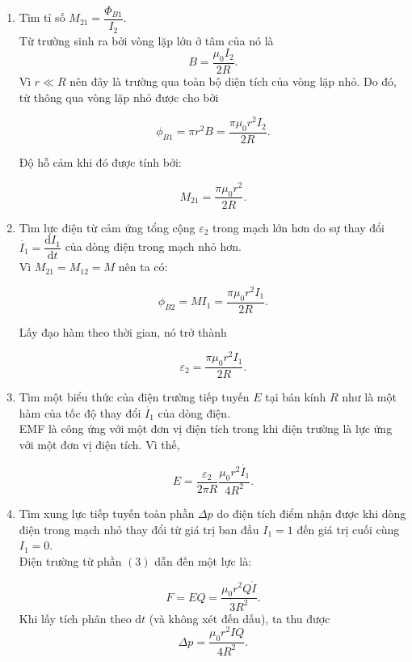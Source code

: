 \begin{loigiai}
\begin{enumerate}[1) ]
    \item Tìm tỉ số $M_{21}=\dfrac{\Phi_{B1}}{I_2}$.\\
    Từ trường sinh ra bởi vòng lặp lớn ở tâm của nó là
    \[B=\dfrac{\mu_0I_2}{2R}. \tag{1} \label{apho11sa.1}\]
    Vì $r\ll R$ nên đây là trường qua toàn bộ diện tích của vòng lặp nhỏ. Do đó, từ thông qua vòng lặp nhỏ được cho bởi
    
    \[\phi_{B1}=\pi r^2B=\dfrac{\pi\mu_0r^2I_2}{2R}. \tag{2} \label{apho11sa.2}\]

    Độ hỗ cảm khi đó được tính bởi: 
    
    \[M_{21}=\dfrac{\pi\mu_0r^2}{2R}. \tag{3} \label{apho11sa.3}\]
    
    \item Tìm lực điện từ cảm ứng tổng cộng $\varepsilon_2$ trong mạch lớn hơn do sự thay đổi $\Dot{I_1}=\dfrac{\mathrm{d}I_1}{\mathrm{d}t}$ của dòng điện trong mạch nhỏ hơn.\\
    Vì $M_{21}=M_{12}=M$ nên ta có:

    \[\phi_{B2}=MI_1=\dfrac{\pi\mu_0r^2I_1}{2R}. \tag{4} \label{apho11sa.4}\]
    
    Lấy đạo hàm theo thời gian, nó trở thành
    
    \[\varepsilon_2=\dfrac{\pi\mu_0r^2I_1}{2R}. \tag{5} \label{apho11sa.5}\]
    
    \item Tìm một biểu thức của điện trường tiếp tuyến $E$ tại bán kính $R$ như là một hàm của tốc độ thay đổi $\Dot{I_1}$ của dòng điện.\\
    EMF là công ứng với một đơn vị điện tích trong khi điện trường là lực ứng với một đơn vị điện tích. Vì thế,
    
    \[E=\dfrac{\varepsilon_2}{2\pi R}\dfrac{\mu_0r^2\Dot{I_1}}{4R^2}. \tag{6} \label{apho11sa.6}\]
    
    \item Tìm xung lực tiếp tuyến toàn phần $\Delta p$ do điện tích điểm nhận được khi dòng điện trong mạch nhỏ thay đổi từ giá trị ban đầu $I_1=1$ đến giá trị cuối cùng $I_1=0$.\\
    Điện trường từ phần $(3)$ dẫn đến một lực là:
    
    \[F=EQ=\dfrac{\mu_0r^2Q\Dot{I}}{3R^2}. \tag{7} \label{apho11sa.7}\]
    Khi lấy tích phân theo $\mathrm{d}t$ (và không xét đến dấu), ta thu được
    \[\Delta p=\dfrac{\mu_0r^2IQ}{4R^2}. \tag{8} \label{apho11sa.8}\]
\end{enumerate}
\end{loigiai}


